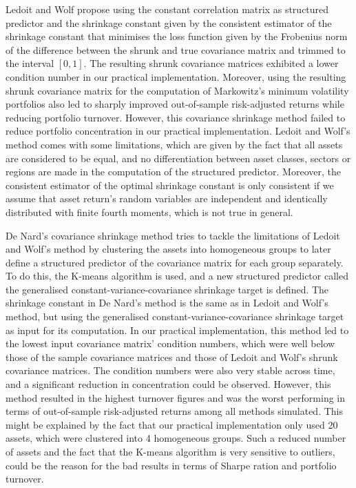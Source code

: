 Ledoit and Wolf propose using the constant correlation matrix as structured predictor and the shrinkage constant given by the consistent estimator of the shrinkage constant that minimises the loss function given by the Frobenius norm of the difference between the shrunk and true covariance matrix and trimmed to the interval $[0,1]$. The resulting shrunk covariance matrices exhibited a lower condition number in our practical implementation. Moreover, using the resulting shrunk covariance matrix for the computation of Markowitz's minimum volatility portfolios also led to sharply improved out-of-sample risk-adjusted returns while reducing portfolio turnover. However, this covariance shrinkage method failed to reduce portfolio concentration in our practical implementation. Ledoit and Wolf's method comes with some limitations, which are given by the fact that all assets are considered to be equal, and no differentiation between asset classes, sectors or regions are made in the computation of the structured predictor. Moreover, the consistent estimator of the optimal shrinkage constant is only consistent if we assume that asset return's random variables are independent and identically distributed with finite fourth moments, which is not true in general.

De Nard's covariance shrinkage method tries to tackle the limitations of Ledoit and Wolf's method by clustering the assets into homogeneous groups to later define a structured predictor of the covariance matrix for each group separately. To do this, the K-means algorithm is used, and a new structured predictor called the generalised constant-variance-covariance shrinkage target is defined. The shrinkage constant in De Nard's method is the same as in Ledoit and Wolf's method, but using the generalised constant-variance-covariance shrinkage target as input for its computation. In our practical implementation, this method led to the lowest input covariance matrix' condition numbers, which were well below those of the sample covariance matrices and those of Ledoit and Wolf's shrunk covariance matrices. The condition numbers were also very stable across time, and a significant reduction in concentration could be observed. However, this method resulted in the highest turnover figures and was the worst performing in terms of out-of-sample risk-adjusted returns among all methods simulated. This might be explained by the fact that our practical implementation only used 20 assets, which were clustered into 4 homogeneous groups. Such a reduced number of assets and the fact that the K-means algorithm is very sensitive to outliers, could be the reason for the bad results in terms of Sharpe ration and portfolio turnover.

